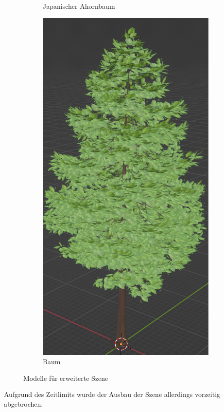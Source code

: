 \begin{figure}[H]
\begin{subfigure}{0.5\textwidth}
		\caption{Japanischer Ahornbaum}
	\end{subfigure}	
	\begin{subfigure}{0.5\textwidth}
		\centering
		\includegraphics[height=0.3\pageheight,keepaspectratio]{pics/16} 
		\caption{Baum}
	\end{subfigure}	
	\caption{Modelle für erweiterte Szene}
\end{figure}
\par
 Aufgrund des Zeitlimits wurde der Ausbau der Szene allerdings vorzeitig abgebrochen.
